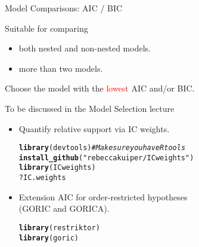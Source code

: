 \documentclass[10pt]{beamer}\usepackage[]{graphicx}\usepackage[]{xcolor}
\makeatletter
\newcommand{\hlsng}[1]{\textcolor[rgb]{0.192,0.494,0.8}{#1}}%
\newcommand{\hlcom}[1]{\textcolor[rgb]{0.678,0.584,0.686}{\textit{#1}}}%
\newcommand{\hlopt}[1]{\textcolor[rgb]{0,0,0}{#1}}%
\newcommand{\hldef}[1]{\textcolor[rgb]{0.345,0.345,0.345}{#1}}%
\newcommand{\hlkwd}[1]{\textcolor[rgb]{0.737,0.353,0.396}{\textbf{#1}}}%
\newenvironment{kframe}{%
 \def\at@end@of@kframe{}%
 \ifinner\ifhmode%
  \def\at@end@of@kframe{\end{minipage}}%
  \begin{minipage}{\columnwidth}%
 \fi\fi%
 \def\FrameCommand##1{\hskip\@totalleftmargin \hskip-\fboxsep
 \colorbox{shadecolor}{##1}\hskip-\fboxsep
     \hskip-\linewidth \hskip-\@totalleftmargin \hskip\columnwidth}%
 \MakeFramed {\advance\hsize-\width
   \@totalleftmargin\z@ \linewidth\hsize
   \@setminipage}}%
 {\par\unskip\endMakeFramed%
 \at@end@of@kframe}
\newenvironment{knitrout}{}{} %
\makeatother
\begin{document}
\begin{frame}[fragile]{Model Comparisons: AIC / BIC}

Suitable for comparing
\begin{itemize}
  \item both nested and non-nested models.
  \item more than two models.
\end{itemize}

\vspace*{5mm}

Choose the model with the \textcolor{red}{lowest} AIC and/or BIC.

\vspace*{5mm}

To be discussed in the Model Selection lecture
\begin{itemize}
  \item Quantify relative support via IC weights.\\
\begin{knitrout}
\color{fgcolor}\begin{kframe}
\begin{alltt}
\hlkwd{library}\hldef{(devtools)} \hlcom{# Make sure you have Rtools}
\hlkwd{install_github}\hldef{(}\hlsng{"rebeccakuiper/ICweights"}\hldef{)}
\hlkwd{library}\hldef{(ICweights)}
\hlopt{?}\hldef{IC.weights}
\end{alltt}
\end{kframe}
\end{knitrout}
  \item Extension AIC for order-restricted hypotheses \\ (GORIC and GORICA).\\
\begin{knitrout}
\color{fgcolor}\begin{kframe}
\begin{alltt}
\hlkwd{library}\hldef{(restriktor)}
\hlkwd{library}\hldef{(goric)}
\end{alltt}
\end{kframe}
\end{knitrout}
\end{itemize}

\end{frame}
%
\end{document}
